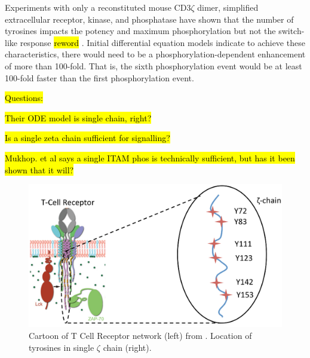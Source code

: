\documentclass[../AdvancementSummary.tex]{subfiles}
\begin{document}
Experiments with only a reconstituted mouse CD3$\zeta$ dimer, simplified extracellular receptor, kinase, and phosphatase have shown that the number of tyrosines impacts the potency and maximum phosphorylation but not the switch-like response \hl{reword} \cite{Mukhopadhyay2016}. Initial differential equation models indicate to achieve these characteristics, there would need to be a phosphorylation-dependent enhancement of more than 100-fold. That is, the sixth phosphorylation event would be at least 100-fold faster than the first phosphorylation event. \cite{Mukhopadhyay2016} 

\hl{Questions:}

\hl{Their ODE model is single chain, right?}

\hl{Is a single zeta chain sufficient for signalling?} 

\hl{Mukhop. et al says a single ITAM phos is technically sufficient, but has it been shown that it will?}

\begin{figure}
	\begin{center}
		\includegraphics[width=0.8\linewidth]{Figures/TCRDiagram.eps}
	\end{center}
\caption{Cartoon of T Cell Receptor network (left) from \cite{Wu2015}. Location of tyrosines in single $\zeta$ chain (right). \label{fig: TCRCartoon}}
\end{figure}


%
%
\end{document}
